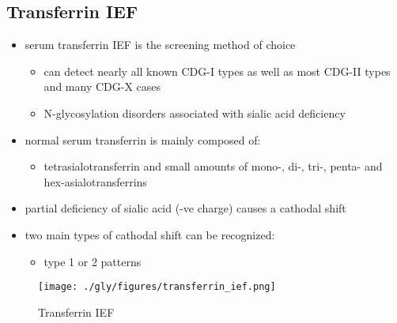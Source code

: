 \documentclass{scrartcl}
\begin{document}
\subsection{Transferrin IEF}
\label{sec:orga5cac3d}
\begin{itemize}
\item serum transferrin IEF is the screening method of choice
\begin{itemize}
\item can detect nearly all known CDG-I types as well as most CDG-II types and many CDG-X cases
\item N-glycosylation disorders associated with sialic acid deficiency
\end{itemize}
\item normal serum transferrin is mainly composed of:
\begin{itemize}
\item tetrasialotransferrin and small amounts of mono-, di-, tri-,
penta- and hex-asialotransferrins
\end{itemize}
\item partial deficiency of sialic acid (-ve charge) causes a
cathodal shift
\item two main types of cathodal shift can be recognized:
\begin{itemize}
\item type 1 or 2 patterns
\end{itemize}
\end{itemize}

\begin{figure}[htbp]
\centering
\texttt{[image: ./gly/figures/transferrin\_ief.png]}
\caption{\label{fig:org35a89e5}
Transferrin IEF}
\end{figure}
\end{document}
